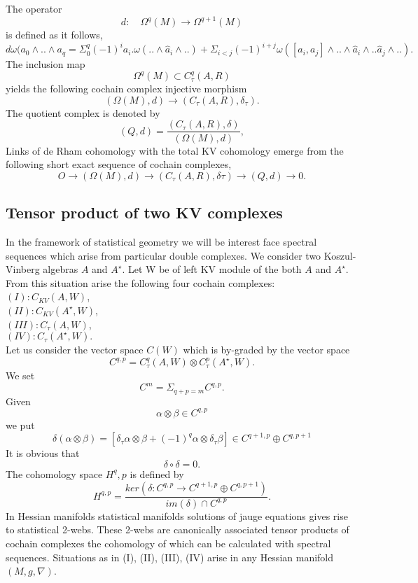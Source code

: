 The operator 
$$d:\quad \Omega^q(M)\rightarrow \Omega^{q+1}(M)$$
is defined as it follows,
$$d\omega (a_0 \wedge .. \wedge a_{q} = \Sigma^{q}_0 (-1)^i a_i.\omega(.. \wedge \hat{a}_i \wedge..) + \Sigma_{i < j}(-1)^{i+j}\omega ([a_i,a_j] \wedge.. \wedge \hat{a}_i \wedge.. \hat{a}_j \wedge..).$$
The inclusion map 
$$\Omega^q(M) \subset C^q_\tau(A,R)$$
yields the following cochain complex injective morphism
$$(\Omega(M),d) \rightarrow (C_\tau(A,R),\delta_\tau).$$
The quotient complex is denoted by
$$(Q,d) = \frac{(C_\tau(A,R),\delta)}{(\Omega(M),d)},$$
Links of de Rham cohomology with the total KV cohomology emerge from the following short exact sequence of cochain complexes,
$$O \rightarrow (\Omega(M),d)\rightarrow (C_\tau(A,R),\delta\tau)\rightarrow (Q,d)\rightarrow 0.$$

\subsection{Tensor product of two KV complexes}
In the framework of statistical geometry we will be interest face spectral sequences which arise from particular double complexes.
We consider two Koszul-Vinberg algebras $A$ and $A^\star$. Let W be of left KV module of the both $A$ and $A^\star$. From this situation arise the following four cochain complexes:\\
$(I): C_{KV}(A,W)$,\\
$(II): C_{KV}(A^\star,W)$,\\
$(III): C_\tau(A,W)$,\\
$(IV): C_\tau(A^\star,W).$\\
Let us consider the vector space $C(W)$ which is by-graded by the vector space
$$ C^{q,p} = C^q_\tau(A,W) \otimes C^p_\tau(A^\star,W).$$
We set
$$C^m = \Sigma_{q+p = m} C^{q,p}.$$
Given $$\alpha \otimes \beta \in C^{q,p}$$
we put
$$\delta(\alpha\otimes\beta) = [ \delta_\tau \alpha\otimes \beta + (-1)^q\alpha \otimes \delta_\tau \beta] \in C^{q+1,p} \oplus C^{q,p+1}$$
It is obvious that 
$$\delta \circ \delta = 0.$$
The cohomology space ${H^q,p}$ is defined by 
$$ H^{q,p}  = \frac{ker(\delta: C^{q,p}\rightarrow C^{q+1,p} \oplus C^{q,p+1})}{im(\delta)\cap C^{q,p}}.$$
In Hessian manifolds statistical manifolds solutions of jauge equations gives rise to statistical 2-webs. These 2-webs are canonically associated tensor products of cochain complexes the cohomology of which can be calculated with spectral sequences.
Situations as in (I), (II), (III), (IV) arise in any Hessian manifold $(M,g,\nabla)$.\\
